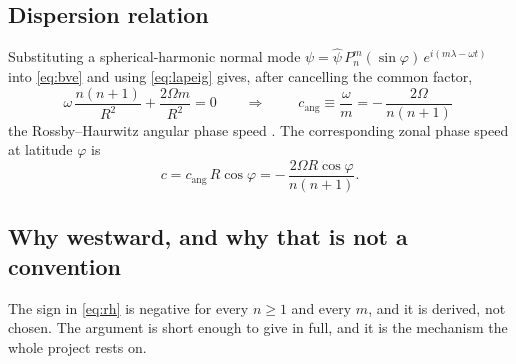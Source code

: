 \documentclass[11pt,a4paper]{article}
\begin{document}
\subsection{Dispersion relation}

Substituting a spherical-harmonic normal mode
$\psi = \hat\psi\,P_n^m(\sin\varphi)\,e^{i(m\lambda - \omega t)}$ into
\eqref{eq:bve} and using \eqref{eq:lapeig} gives, after cancelling the common
factor,
%
\begin{equation}
\omega\, \frac{n(n+1)}{R^2} + \frac{2\Omega m}{R^2} = 0
\qquad\Longrightarrow\qquad
\boxed{\;c_{\mathrm{ang}} \equiv \frac{\omega}{m}
      = -\,\frac{2\Omega}{n(n+1)}\;}
\label{eq:rh}
\end{equation}
%
the Rossby--Haurwitz angular phase speed \citep{rossby1939,haurwitz1940b}. The
corresponding zonal phase speed at latitude $\varphi$ is
%
\begin{equation}
c = c_{\mathrm{ang}}\,R\cos\varphi = -\,\frac{2\Omega R\cos\varphi}{n(n+1)} .
\label{eq:rhzonal}
\end{equation}

\subsection{Why westward, and why that is not a convention}

The sign in \eqref{eq:rh} is negative for every $n \ge 1$ and every $m$, and it
is derived, not chosen. The argument is short enough to give in full, and it is
the mechanism the whole project rests on.
\end{document}
